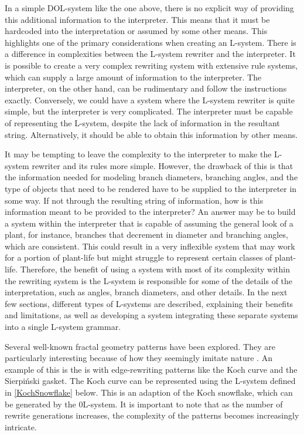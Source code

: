 In a simple DOL-system like the one above, there is no explicit way of providing this additional information to the interpreter. This means that it must be hardcoded into the interpretation or assumed by some other means. This highlights one of the primary considerations when creating an L-system. There is a difference in complexities between the L-system rewriter and the interpreter. It is possible to create a very complex rewriting system with extensive rule systems, which can supply a large amount of information to the interpreter. The interpreter, on the other hand, can be rudimentary and follow the instructions exactly. Conversely, we could have a system where the L-system rewriter is quite simple, but the interpreter is very complicated. The interpreter must be capable of representing the L-system, despite the lack of information in the resultant string. Alternatively, it should be able to obtain this information by other means. 

\newpage
\noindent
It may be tempting to leave the complexity to the interpreter to make the L-system rewriter and its rules more simple. However, the drawback of this is that the information needed for modeling branch diameters, branching angles, and the type of objects that need to be rendered have to be supplied to the interpreter in some way. If not through the resulting string of information, how is this information meant to be provided to the interpreter? An answer may be to build a system within the interpreter that is capable of assuming the general look of a plant, for instance, branches that decrement in diameter and branching angles, which are consistent. This could result in a very inflexible system that may work for a portion of plant-life but might struggle to represent certain classes of plant-life. Therefore, the benefit of using a system with most of its complexity within the rewriting system is the L-system is responsible for some of the details of the interpretation, such as angles, branch diameters, and other details. In the next few sections, different types of L-systems are described, explaining their benefits and limitations, as well as developing a system integrating these separate systems into a single L-system grammar.   

Several well-known fractal geometry patterns have been explored. They are particularly interesting because of how they seemingly imitate nature \cite{mandelbrot1982fractal}. An example of this is the is with edge-rewriting patterns like the Koch curve and the Sierpi\'{n}ski gasket. The Koch curve can be represented using the L-system defined in \ref{KochSnowflake} below. This is an adaption of the Koch snowflake, which can be generated by the 0L-system. It is important to note that as the number of rewrite generations increases, the complexity of the patterns becomes increasingly intricate.

